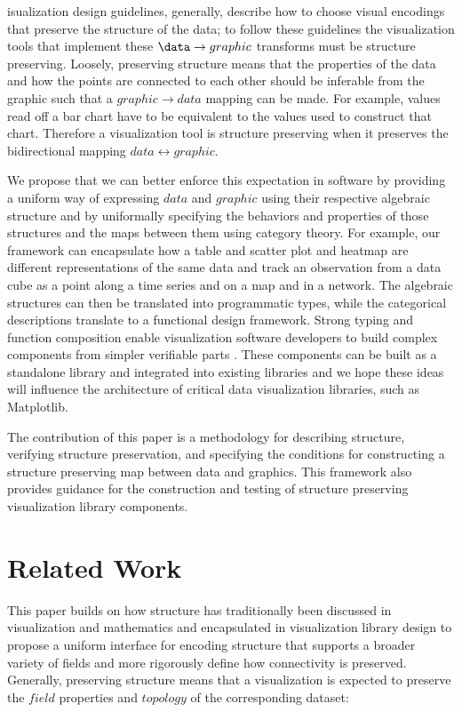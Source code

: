 \documentclass[journal]{IEEEtran}
\theoremstyle{definition}
\theoremstyle{remark}
\begin{document}
isualization design guidelines, generally, describe how to choose visual encodings that preserve the structure of the data; to follow these guidelines the visualization tools that implement these $\data \rightarrow graphic$ transforms must be structure preserving. Loosely, preserving structure means that the properties of the data and how the points are connected to each other should be inferable from the graphic such that a $graphic \rightarrow data$ mapping can be made. For example, values read off a bar chart have to be equivalent to the values used to construct that chart. Therefore a visualization tool is structure preserving when it preserves the bidirectional mapping $data\leftrightarrow graphic$.

We propose that we can better enforce this expectation in software by providing a uniform way of expressing $data$ and $graphic$ using their respective algebraic structure and by uniformally specifying the behaviors and properties of those structures and the maps between them using category theory. For example, our framework can encapsulate how a table and scatter plot and heatmap are different representations of the same data and track an observation from a data cube as a point along a time series and on a map and in a network. The algebraic structures can then be translated into programmatic types, while the categorical descriptions translate to a functional design framework. Strong typing and function composition enable visualization software developers to build complex components from simpler verifiable parts \cite{huHowFunctionalProgramming2015, hughesWhyFunctionalProgramming1989}. These components can be built as a standalone library and integrated into existing libraries and we hope these ideas will influence the architecture of critical data visualization libraries, such as Matplotlib.

The contribution of this paper is a methodology for describing structure, verifying structure preservation, and specifying the conditions for constructing a structure preserving map between data and graphics. This framework also provides guidance for the construction and testing of structure preserving visualization library components.

\section{Related Work}
\label{sec:related-work}

This paper builds on how structure has traditionally been discussed in visualization and mathematics and encapsulated in visualization library design to propose a uniform interface for encoding structure that supports a broader variety of fields and more rigorously define how connectivity is preserved. Generally, preserving structure means that a visualization is expected to preserve the $field$ properties and $topology$ of the corresponding dataset:
\end{document}
